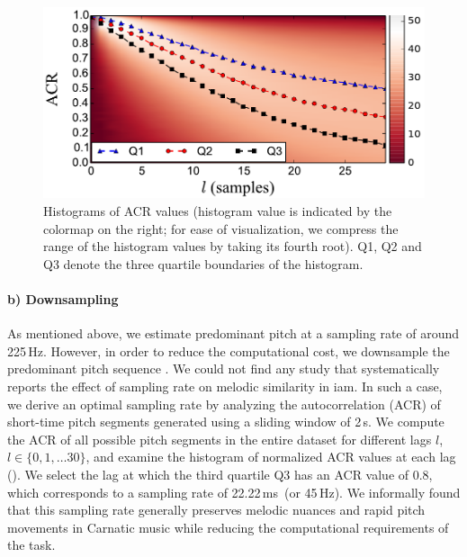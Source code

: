 \begin{figure}
	\begin{center}
		\includegraphics[width=\figSizeEightyFive]{ch06_patterns/figures/discovery/ACRHistogram.pdf}
	\end{center}
	\caption{Histograms of ACR values (histogram value is indicated by the colormap on the right; for ease of visualization, we compress the range of the histogram values by taking its fourth root). Q1, Q2 and Q3 denote the three quartile boundaries of the histogram. }
	\label{fig:ACRHistogram}
\end{figure}


\paragraph{b) Downsampling}

As mentioned above, we estimate predominant pitch at a sampling rate of around 225\,Hz. However, in order to reduce the computational cost, we downsample the predominant pitch sequence . We could not find any study that systematically reports the effect of sampling rate on melodic similarity in \gls{iam}. In such a case, we derive an optimal sampling rate by analyzing the autocorrelation (ACR) of short-time pitch segments generated using a sliding window of 2\,s. We compute the ACR of all possible pitch segments in the entire dataset for different lags $l$, $l\in \lbrace0,1,\dots30\rbrace$, and examine the histogram of normalized ACR values at each lag (). We select the lag at which the third quartile Q3 has an ACR value of 0.8, which corresponds to a sampling rate of 22.22\,ms~(or 45\,Hz). We informally found that this sampling rate generally preserves melodic nuances and rapid pitch movements in Carnatic music while reducing the computational requirements of the task. 

